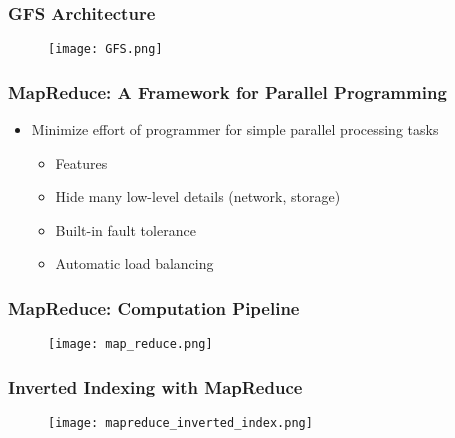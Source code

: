 \subsubsection{GFS Architecture}
\begin{figure}[H]
    \centering
    \texttt{[image: GFS.png]}
\end{figure}

\subsubsection{MapReduce: A Framework for Parallel Programming}
\begin{itemize}
\item Minimize effort of programmer for simple parallel processing tasks
\begin{itemize}
\item Features
\item Hide many low-level details (network, storage) 
\item Built-in fault tolerance
\item Automatic load balancing
\end{itemize}
\end{itemize}


\subsubsection{MapReduce: Computation Pipeline}
\begin{figure}[H]
    \centering
    \texttt{[image: map\_reduce.png]}
\end{figure}


\subsubsection{Inverted Indexing with MapReduce}

\begin{figure}[H]
    \centering
    \texttt{[image: mapreduce\_inverted\_index.png]}
\end{figure}


